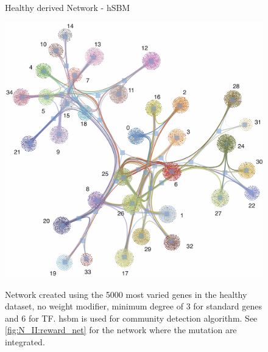 
\newpage
{}
\begin{figure}[p]
      \thispagestyle{empty} %
      \centering
      \captionsetup{justification=centering, labelfont=bf}
      \parbox{\textwidth}{\centering \Huge Healthy derived Network - hSBM       \vspace{0.5cm} } %
      \includegraphics[width=0.9\paperwidth,keepaspectratio]{Sections/Network_pages/images/hier_sfdp_standard_5K_6TF_hsbm_6K_v2_labels_low_res.jpg} 
      \vspace{0.5cm}
      \label{fig:N_II:standard_network}
      \parbox{0.8\textwidth}{Network created using the 5000 most varied genes in the healthy dataset, no weight modifier, minimum degree of 3 for standard genes and 6 for TF. \acrlong{hsbm} is used for community detection algorithm. See \cref{fig:N_II:reward_net} for the network where the mutation are integrated.}
\end{figure}
\restoregeometry
